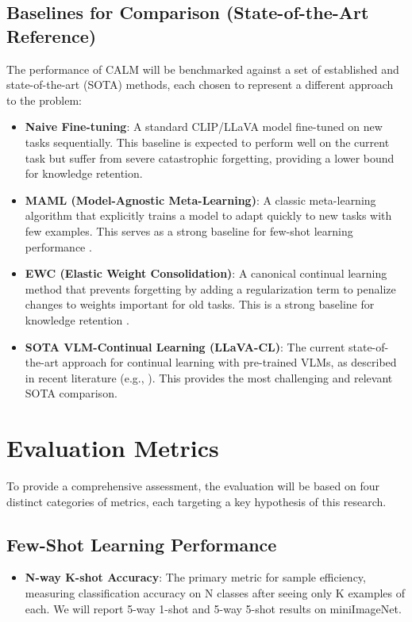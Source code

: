 \documentclass[12pt]{article}
\begin{document}
\subsection{Baselines for Comparison (State-of-the-Art Reference)}
The performance of CALM will be benchmarked against a set of established and state-of-the-art (SOTA) methods, each chosen to represent a different approach to the problem:
\begin{itemize}
    \item \textbf{Naive Fine-tuning}: A standard CLIP/LLaVA model fine-tuned on new tasks sequentially. This baseline is expected to perform well on the current task but suffer from severe catastrophic forgetting, providing a lower bound for knowledge retention.
    \item \textbf{MAML (Model-Agnostic Meta-Learning)}: A classic meta-learning algorithm that explicitly trains a model to adapt quickly to new tasks with few examples. This serves as a strong baseline for few-shot learning performance \citep{Finn2017}.
    \item \textbf{EWC (Elastic Weight Consolidation)}: A canonical continual learning method that prevents forgetting by adding a regularization term to penalize changes to weights important for old tasks. This is a strong baseline for knowledge retention \citep{Kirkpatrick2017}.
    \item \textbf{SOTA VLM-Continual Learning (LLaVA-CL)}: The current state-of-the-art approach for continual learning with pre-trained VLMs, as described in recent literature (e.g., \citealp{Smith2024}). This provides the most challenging and relevant SOTA comparison.
\end{itemize}

\section{Evaluation Metrics}
To provide a comprehensive assessment, the evaluation will be based on four distinct categories of metrics, each targeting a key hypothesis of this research.

\subsection{Few-Shot Learning Performance}
\begin{itemize}
    \item \textbf{N-way K-shot Accuracy}: The primary metric for sample efficiency, measuring classification accuracy on N classes after seeing only K examples of each. We will report 5-way 1-shot and 5-way 5-shot results on miniImageNet.
\end{itemize}
\end{document}
